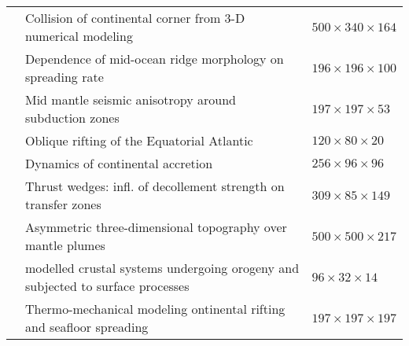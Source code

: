 \begin{tabular}{lll}
\cite{lixg13} & Collision of continental corner from 3-D numerical modeling                     & $500 \times 340 \times 164$ \\%
\cite{puge14} & Dependence of mid-ocean ridge morphology on spreading rate                      & $196\times196\times100$ \\%
\cite{facc14} & Mid mantle seismic anisotropy around subduction zones                           & $197\times197\times53$ \\%
\cite{hebr14} & Oblique rifting of the Equatorial Atlantic                                      & $120\times80\times20$ \\%
\cite{mobm14} & Dynamics of continental accretion                                               & $256\times96\times96$ \\
\cite{rugb14} & Thrust wedges: infl. of decollement strength on transfer zones                  & $309\times85\times149$\\
\cite{buge14} & Asymmetric three-dimensional topography over mantle plumes                      & $500\times500\times217$ \\
\cite{thsh14} & modelled crustal systems undergoing orogeny and subjected to surface processes  & $96\times32\times14$\\
\cite{lige14b}& Thermo-mechanical modeling ontinental rifting and seafloor spreading            & $197\times197\times197$  \\ 
\hline
\end{tabular}



